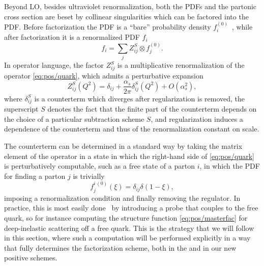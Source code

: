 Beyond LO, besides ultraviolet renormalization, both the
PDFs and the partonic cross section are beset by collinear
singularities which can be factored into the PDF. Before
factorization the PDF is a ``bare'' probability density $f_i^{(0)}$~\cite{Collins:2011zzd}, while after
factorization it is a
renormalized PDF  $f_i$
\begin{equation}
  \label{eq:pos/pdffac}
f_i =\sum_{j} Z^S_{ij}\otimes f_j^{(0)}. %
\end{equation}
In operator language, the  factor $Z^S_{ij}$ is a multiplicative
renormalization of the operator \cref{eq:pos/quark}, which admits a
perturbative expansion
\begin{equation}\label{eq:pos/pertz}
Z^S_{ij}(Q^2)=\delta_{ij}+\frac{\alpha_s}{2\pi}
\delta^S_{ij}(Q^2)+O(\alpha_s^2),
\end{equation}
where $\delta^S_{ij}$ is a counterterm which diverges after
regularization is removed, the superscript $S$ denotes the fact
that the finite part of the counterterm depends on the choice of a
particular subtraction scheme $S$, and regularization induces a
dependence of the counterterm and thus of the renormalization constant
on scale.

The counterterm can be determined
in a standard way by taking the matrix element of the
operator in a state in which the right-hand side of
\cref{eq:pos/quark} is perturbatively computable, such as a free
state of a parton $i$, in which the PDF for finding a parton $j$ is
trivially
\begin{equation} \label{eq:pos/freef}
  f_j^{i\,(0)}(\xi)=\delta_{ij}\delta(1-\xi),
\end{equation}
imposing a
renormalization condition and finally removing the regulator. In practice, this
is most easily done~\cite{Collins:2011zzd,Curci:1980uw} by introducing
a probe that couples to the free 
quark, so for instance computing the structure function
\cref{eq:pos/masterfac} for deep-inelastic scattering off a free
quark. This is the strategy that we will follow in this section, where
such a computation will be performed explicitly in a way that fully
determines the factorization scheme, both in the \msbar{} and in our
new positive schemes.


